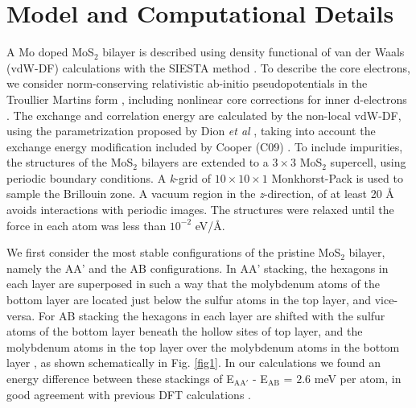\documentclass[pra,twocolumn,preprintnumbers,amsmath,amssymb]{revtex4}
\begin{document}
\section{Model and Computational Details} \label{compdetail}
A Mo doped MoS$_2$ bilayer is described using density functional of van der Waals (vdW-DF) calculations with the SIESTA method \cite{soler2002siesta}. To describe the core electrons, we consider norm-conserving  relativistic ab-initio pseudopotentials in the Troullier Martins form \cite{PhysRevB.43.1993},  including nonlinear core corrections for inner d-electrons \cite{PhysRevB.26.1738}.
The exchange and correlation energy are calculated by the non-local vdW-DF, using the parametrization proposed by Dion \textit{et al} \cite{PhysRevLett.92.246401}, taking into account the exchange energy modification included by Cooper (C09) \cite{PhysRevB.81.161104}.
To include impurities, the structures of the MoS$_{2}$ bilayers are extended to a $3\times3$ MoS$_{2}$ supercell, using periodic boundary conditions. A \textit{k}-grid of $10\times10\times1$ Monkhorst-Pack is used to sample the Brillouin zone. A vacuum region in the \textit{z}-direction, of at least 20 \AA{} avoids interactions with periodic images.
The structures were relaxed until the force in each atom was less than $10^{-2}$ eV/\AA.

We first consider the most stable configurations of the pristine MoS$_{2}$ bilayer, namely the AA' and the AB con\-fi\-gu\-ra\-tions.
In AA' stacking, the hexagons in each layer are superposed in such a way that the molybdenum atoms of the bottom layer are located just below the sulfur atoms in the top layer, and vice-versa. For AB stacking the hexagons in each layer are shifted with the sulfur atoms of the bottom layer beneath the hollow sites of top layer, and the molybdenum atoms in the top layer over the molybdenum atoms in the bottom layer \cite{he2014stacking}, as shown schematically in Fig. \ref{fig1}.
In our calculations we found an energy difference between these stackings of E$_\mathrm{AA'}$ - E$_\mathrm{AB}$ =  $2.6$ meV per atom, in good agreement with previous DFT calculations \cite{he2014stacking,yan2016identifying,yang2014vapor}.
\end{document}
